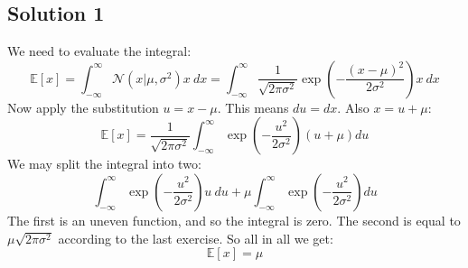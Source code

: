 \documentclass[12pt, a4paper]{article}
\numberwithin{equation}{section}
\begin{document}
\subsection{Solution 1}
We need to evaluate the integral:
\begin{equation}
\mathbb{E}[x]=\int_{-\infty}^\infty\mathcal{N}(x|\mu,\sigma^2)x\ dx=\int_{-\infty}^\infty\frac{1}{\sqrt{2\pi\sigma^2}}\exp\left(-\frac{(x-\mu)^2}{2\sigma^2}\right)x\ dx
\end{equation}
Now apply the substitution $u=x-\mu$. This means $du=dx$. Also $x=u+\mu$:
\begin{equation}
\mathbb{E}[x]=\frac{1}{\sqrt{2\pi\sigma^2}}\int_{-\infty}^\infty\exp\left(-\frac{u^2}{2\sigma^2}\right)(u+\mu)du
\end{equation}
We may split the integral into two:
\begin{equation}
\int_{-\infty}^\infty\exp\left(-\frac{u^2}{2\sigma^2}\right)u\ du+\mu\int_{-\infty}^\infty\exp\left(-\frac{u^2}{2\sigma^2}\right)du
\end{equation}
The first is an uneven function, and so the integral is zero. The second is equal to $\mu\sqrt{2\pi\sigma^2}$ according to the last exercise. So all in all we get:
\begin{equation}
\mathbb{E}[x]=\mu
\end{equation} 
\end{document}
